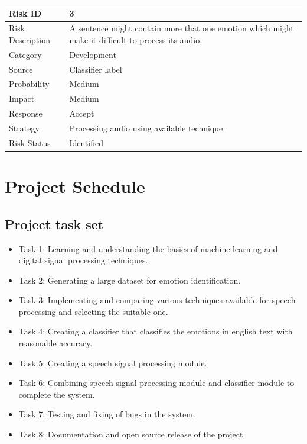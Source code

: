 \documentclass[oneside,a4paper,12pt]{book}
\begin{document}
\begin{table}[!htbp]
	\begin{center}
		\def\arraystretch{1.5}
		\begin{tabularx}{\textwidth}{| l | X |}
			\hline 
			Risk ID	& 3 \\ \hline
			Risk Description	& A sentence might contain more that one emotion which might make it difficult to process its audio. \\ \hline
			Category	& Development \\ \hline
			Source	& Classifier label \\ \hline
			Probability	& Medium \\ \hline
			Impact	& Medium \\ \hline
			Response	& Accept \\ \hline
			Strategy	& Processing audio using available technique  \\ \hline
			Risk Status	& Identified \\ \hline
		\end{tabularx}
	\end{center}
	\label{tab:risk3}
\end{table}

\section{Project Schedule}  
\subsection{Project task set} 
\begin{itemize}
	\item[]Task 1: Learning and understanding the basics of machine learning and digital signal processing techniques.
	\item[]Task 2: Generating a large dataset for emotion identification. 
	\item[]Task 3: Implementing and comparing various techniques available for speech processing and selecting the suitable one.
	\item[]Task 4: Creating a classifier that classifies the emotions in english text with reasonable accuracy.
	\item[]Task 5: Creating a speech signal processing module.
	\item[]Task 6: Combining speech signal processing module and classifier module to complete the system.
	\item[]Task 7: Testing and fixing of bugs in the system.
	\item[]Task 8: Documentation and open source release of the project.
\end{itemize}
\end{document}
